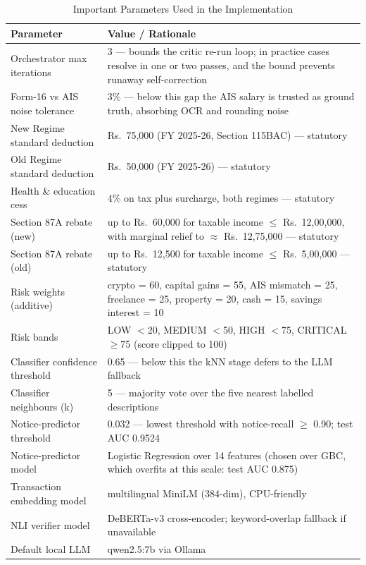 \begin{table}[H]
\centering
\caption{Important Parameters Used in the Implementation}
\label{tab:parameters}
\small
\begin{tabularx}{\textwidth}{|l|X|}
\hline
\textbf{Parameter} & \textbf{Value / Rationale} \\
\hline
Orchestrator max iterations & 3 --- bounds the critic re-run loop; in practice cases resolve in one or two passes, and the bound prevents runaway self-correction \\
\hline
Form-16 vs AIS noise tolerance & 3\% --- below this gap the AIS salary is trusted as ground truth, absorbing OCR and rounding noise \\
\hline
New Regime standard deduction & Rs.~75,000 (FY 2025-26, Section 115BAC) --- statutory \\
\hline
Old Regime standard deduction & Rs.~50,000 (FY 2025-26) --- statutory \\
\hline
Health \& education cess & 4\% on tax plus surcharge, both regimes --- statutory \\
\hline
Section 87A rebate (new) & up to Rs.~60,000 for taxable income $\leq$ Rs.~12,00,000, with marginal relief to $\approx$ Rs.~12,75,000 --- statutory \\
\hline
Section 87A rebate (old) & up to Rs.~12,500 for taxable income $\leq$ Rs.~5,00,000 --- statutory \\
\hline
Risk weights (additive) & crypto = 60, capital gains = 55, AIS mismatch = 25, freelance = 25, property = 20, cash = 15, savings interest = 10 \\
\hline
Risk bands & LOW $<$20, MEDIUM $<$50, HIGH $<$75, CRITICAL $\geq$75 (score clipped to 100) \\
\hline
Classifier confidence threshold & 0.65 --- below this the kNN stage defers to the LLM fallback \\
\hline
Classifier neighbours (k) & 5 --- majority vote over the five nearest labelled descriptions \\
\hline
Notice-predictor threshold & 0.032 --- lowest threshold with notice-recall $\geq$ 0.90; test AUC 0.9524 \\
\hline
Notice-predictor model & Logistic Regression over 14 features (chosen over GBC, which overfits at this scale: test AUC 0.875) \\
\hline
Transaction embedding model & multilingual MiniLM (384-dim), CPU-friendly \\
\hline
NLI verifier model & DeBERTa-v3 cross-encoder; keyword-overlap fallback if unavailable \\
\hline
Default local LLM & qwen2.5:7b via Ollama \\
\hline
\end{tabularx}
\end{table}
